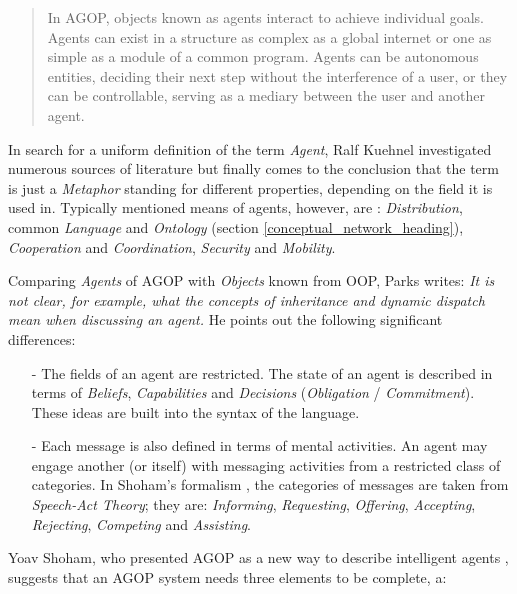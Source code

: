 \begin{quote}
    In AGOP, objects known as agents interact to achieve individual goals.
    Agents can exist in a structure as complex as a global internet or one as
    simple as a module of a common program. Agents can be autonomous entities,
    deciding their next step without the interference of a user, or they can be
    controllable, serving as a mediary between the user and another agent.
\end{quote}

In search for a uniform definition of the term \emph{Agent}, Ralf Kuehnel
investigated numerous sources of literature but finally comes to the conclusion
\cite[p. 203]{kuehnel} that the term is just a \emph{Metaphor} standing for
different properties, depending on the field it is used in. Typically mentioned
means of agents, however, are \cite[p. 11]{kuehnel}: \emph{Distribution}, common
\emph{Language} and \emph{Ontology} (section \ref{conceptual_network_heading}),
\emph{Cooperation} and \emph{Coordination}, \emph{Security} and \emph{Mobility}.

Comparing \emph{Agents} of AGOP with \emph{Objects} known from OOP, Parks
\cite{parks} writes: \textit{It is not clear, for example, what the concepts of
inheritance and dynamic dispatch mean when discussing an agent.} He points out
the following significant differences:

\begin{itemize}
    \item[-] The fields of an agent are restricted. The state of an agent is
        described in terms of \emph{Beliefs}, \emph{Capabilities} and
        \emph{Decisions} (\emph{Obligation} / \emph{Commitment}). These ideas
        are built into the syntax of the language.
    \item[-] Each message is also defined in terms of mental activities. An agent
        may engage another (or itself) with messaging activities from a restricted
        class of categories. In Shoham's formalism \cite{shoham}, the categories
        of messages are taken from \emph{Speech-Act Theory}; they are:
        \emph{Informing}, \emph{Requesting}, \emph{Offering}, \emph{Accepting},
        \emph{Rejecting}, \emph{Competing} and \emph{Assisting}.
\end{itemize}

Yoav Shoham, who presented AGOP as a new way to describe intelligent agents
\cite{shoham}, suggests that an AGOP system needs three elements to be
complete, a:


